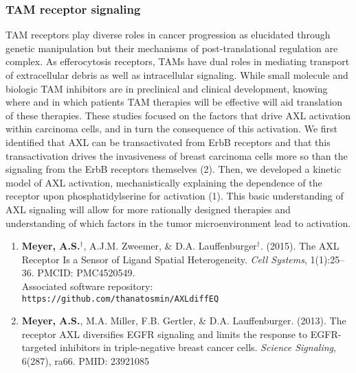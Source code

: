\documentclass[11pt]{article}
\begin{document}

\subsubsection{TAM receptor signaling}

TAM receptors play diverse roles in cancer progression as elucidated through genetic manipulation but their mechanisms of post-translational regulation are complex. As efferocytosis receptors, TAMs have dual roles in mediating transport of extracellular debris as well as intracellular signaling. While small molecule and biologic TAM inhibitors are in preclinical and clinical development, knowing where and in which patients TAM therapies will be effective will aid translation of these therapies. These studies focused on the factors that drive AXL activation within carcinoma cells, and in turn the consequence of this activation. We first identified that AXL can be transactivated from ErbB receptors and that this transactivation drives the invasiveness of breast carcinoma cells more so than the signaling from the ErbB receptors themselves (2). Then, we developed a kinetic model of AXL activation, mechanistically explaining the dependence of the receptor upon phosphatidylserine for activation (1). This basic understanding of AXL signaling will allow for more rationally designed therapies and understanding of which factors in the tumor microenvironment lead to activation.

\begin{enumerate}
  \item \textbf{Meyer, A.S.}$^\dag$, A.J.M. Zweemer, \& D.A. Lauffenburger$^\dag$. (2015). The AXL Receptor Is a Sensor of Ligand Spatial Heterogeneity. \emph{Cell Systems}, 1(1):25--36. PMCID: PMC4520549.\\ Associated software repository: \texttt{https://github.com/thanatosmin/AXLdiffEQ}
  \item \textbf{Meyer, A.S.}, M.A. Miller, F.B. Gertler, \& D.A. Lauffenburger. (2013). The receptor AXL diversifies EGFR signaling and limits the response to EGFR-targeted inhibitors in triple-negative breast cancer cells. \emph{Science Signaling}, 6(287), ra66. PMID: 23921085
\end{enumerate}
\end{document}
